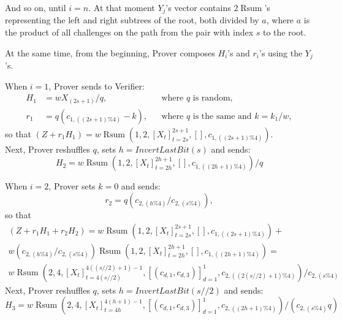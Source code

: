 \documentclass{mathcryptology} %
\DeclareMathOperator{\Rsum}{Rsum}
\newcommand{\InvertLastBit}{\textit{InvertLastBit}}
\theoremstyle{title}
\theoremstyle{titleof}
\begin{document}
    And so on, until $i=n$. At that moment $Y_{j}$'s vector contains $2\Rsum$'s representing the left and right subtrees of the root, both divided by $a$, where $a$ is the product of all challenges on the path from the pair with index $s$ to the root.

    At the same time, from the beginning, Prover composes $H_{i}$'s and $r_{i}$'s using the $Y_{j}$'s.
    
    When $i=1$, Prover sends to Verifier:
    \begin{align*}
        H_{1} & = w X_{\left(2s+1\right)}/q, &&\text{where $q$ is random,}\\
        r_{1} & = q\left(c_{1,\left(\left(2s+1\right)\%4\right)}-k\right), &&\text{where $q$ is the same and $k=k_{1}/w$},
    \end{align*}
    so that $\left(Z+r_{1}H_{1}\right)=w\Rsum\left(1,2, {\left[X_{t}\right]}_{t=2s}^{2s+1}, [],c_{1,\left(\left(2s+1\right)\%4\right)}\right)$.\\
    Next, Prover reshuffles $q$, sets $h=\InvertLastBit\left(s\right)$ and sends:
    \begin{equation*}
        H_{2} = w\Rsum\left(1,2,{\left[X_{t}\right]}_{t=2h}^{2h+1}, [],
        c_{1,\left(\left(2h+1\right)\%4\right)}\right) / q
    \end{equation*}
    
    When $i=2$, Prover sets $k=0$ and sends:
    \begin{equation*}
        r_{2} = q\left(c_{2,\left(h\%4\right)} / c_{2,\left(s\%4\right)}\right),
    \end{equation*}
    so that
    \begin{multline*}
        \left(Z+r_{1}H_{1}+r_{2}H_{2}\right) =
            w\Rsum\left(1,2,{[X_{t}]}_{t=2s}^{2s+1},[],c_{1,((2s+1)\%4)}\right) + \\
            w(c_{2,(h\%4)}/c_{2,(s\%4)})\Rsum\left(1,2,{[X_{t}]}_{t=2h}^{2h+1},[],c_{1,((2h+1)\%4)}\right)=
            \\
            w\Rsum\left(2,4, {\left[X_{t}\right]}_{t=4(s//2)}^{4((s//2)+1)-1},{\left[\left(c_{d,1},
            c_{d,3}\right)\right]}_{d=1}^1, c_{2,((2(s//2)+1)\%4)}\right)
            / c_{2,(s\%4)}
    \end{multline*}
    Next, Prover reshuffles $q$, sets $h=\InvertLastBit\left(s//2\right)$ and sends:
    \begin{equation*}
        H_{3} = w\Rsum\left(2,4, {\left[X_{t}\right]}_{t=4h}^{4(h+1)-1},
        {\left[\left(c_{d,1}, c_{d,3}\right)\right]}_{d=1}^{1},
        c_{2,((2h+1)\%4)}\right) / (c_{2,(s\%4)}q)
    \end{equation*}
    
\end{document}
